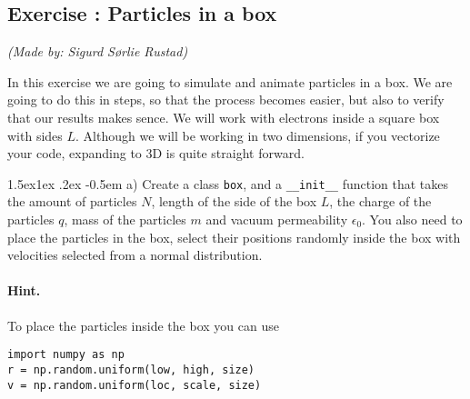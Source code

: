 \documentclass[%
oneside,                 %
final,                   %
10pt]{article}
\makeatletter
\newenvironment{doconceexercise}{}{}
\newcounter{doconceexercisecounter}
\newcommand\subex{\@startsection{paragraph}{4}{\z@}%
                  {1.5ex\@plus1ex \@minus.2ex}%
                  {-0.5em}%
                  {\normalfont\normalsize\bfseries}}
\makeatother
\begin{document}

\newcommand{\exercisesection}[1]{\subsection*{#1}}





\begin{doconceexercise}

\exercisesection{Exercise \thedoconceexercisecounter: Particles in a box}


\emph{(Made by: Sigurd Sørlie Rustad)}

\noindent
In this exercise we are going to simulate and animate particles in a box. We are going to do this in steps, so that the process becomes easier, but also to verify that our results makes sence. We will work with electrons inside a square box with sides $L$. Although we will be working in two dimensions, if you vectorize your code, expanding to 3D is quite straight forward.


\subex{a)}
Create a class \texttt{box}, and a \texttt{\_\_init\_\_} function that takes the amount of particles $N$, length of the side of the box $L$, the charge of the particles $q$, mass of the particles $m$ and vacuum permeability $\epsilon_0$. You also need to place the particles in the box, select their positions randomly inside the box with velocities selected from a normal distribution.


\paragraph{Hint.}
To place the particles inside the box you can use
\begin{verbatim}
import numpy as np
r = np.random.uniform(low, high, size)
v = np.random.uniform(loc, scale, size)
\end{verbatim}




\end{doconceexercise}
\end{document}
